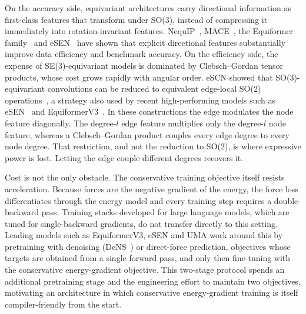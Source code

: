 On the accuracy side, equivariant architectures carry directional information as first-class features that transform under SO(3), instead of compressing it immediately into rotation-invariant features.
NequIP~\cite{batzner2022nequip}, MACE~\cite{batatia2022mace}, the Equiformer family~\cite{liao2022equiformer,liao2023equiformerv2,liao2026equiformerv3} and eSEN~\cite{fu2025esen} have shown that explicit directional features substantially improve data efficiency and benchmark accuracy.
On the efficiency side, the expense of SE(3)-equivariant models is dominated by Clebsch--Gordan tensor products, whose cost grows rapidly with angular order.
eSCN showed that SO(3)-equivariant convolutions can be reduced to equivalent edge-local SO(2) operations~\cite{passaro2023reducing}, a strategy also used by recent high-performing models such as eSEN~\cite{fu2025esen} and EquiformerV3~\cite{liao2026equiformerv3}.
In these constructions the edge modulates the node feature diagonally.
The degree-$l$ edge feature multiplies only the degree-$l$ node feature, whereas a Clebsch--Gordan product couples every edge degree to every node degree.
That restriction, and not the reduction to SO(2), is where expressive power is lost.
Letting the edge couple different degrees recovers it.

Cost is not the only obstacle.
The conservative training objective itself resists acceleration.
Because forces are the negative gradient of the energy, the force loss differentiates through the energy model and every training step requires a double-backward pass.
Training stacks developed for large language models, which are tuned for single-backward gradients, do not transfer directly to this setting.
Leading models such as EquiformerV3, eSEN and UMA work around this by pretraining with denoising (DeNS~\cite{liao2024dens}) or direct-force prediction, objectives whose targets are obtained from a single forward pass, and only then fine-tuning with the conservative energy-gradient objective.
This two-stage protocol spends an additional pretraining stage and the engineering effort to maintain two objectives, motivating an architecture in which conservative energy-gradient training is itself compiler-friendly from the start.

